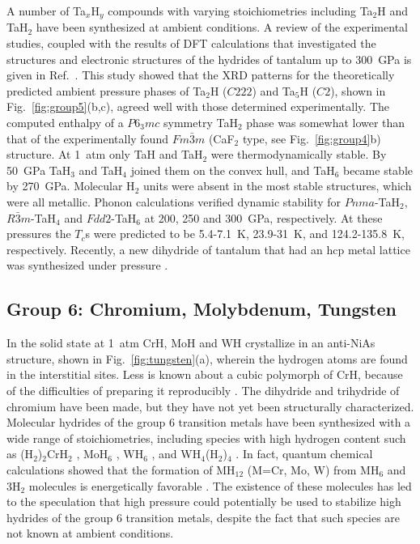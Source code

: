 \documentclass[12pt,letterpaper,oneside]{article}
\begin{document}
A number of Ta$_x$H$_y$ compounds with varying stoichiometries including Ta$_2$H and TaH$_2$ have been synthesized at ambient conditions. A review of the experimental studies, coupled with the results of DFT calculations that investigated the structures and electronic structures of the hydrides of tantalum up to 300~GPa is given in Ref.\ \cite{Zhuang:2017a}. This study showed that 
the XRD patterns for the theoretically predicted ambient pressure phases of Ta$_2$H ($C222$) and Ta$_5$H ($C2$), shown in Fig.\ \ref{fig:group5}(b,c), agreed well with those determined experimentally. The computed enthalpy of a $P6_3mc$ symmetry TaH$_2$ phase was somewhat lower than that of the experimentally found $Fm\bar{3}m$ (CaF$_2$ type, see Fig.\ \ref{fig:group4}b) structure. At 1~atm only TaH and TaH$_2$ were thermodynamically stable. By 50~GPa TaH$_3$ and TaH$_4$ joined them on the convex hull, and TaH$_6$ became stable by 270~GPa. Molecular H$_2$ units were absent in the most stable structures, which were all metallic. Phonon calculations verified dynamic stability for $Pnma$-TaH$_2$, $R\bar{3}m$-TaH$_4$ and $Fdd2$-TaH$_6$ at 200, 250 and 300~GPa, respectively. At these pressures the $T_c$s were predicted to be 5.4-7.1~K, 23.9-31~K, and 124.2-135.8~K, respectively. Recently, a new dihydride of tantalum that had an hcp metal lattice was synthesized under pressure \cite{Kuzovnikov:2017a}. 


\subsection{Group 6: Chromium, Molybdenum, Tungsten} 
%
In the solid state at 1~atm CrH, MoH and WH crystallize in an anti-NiAs structure, shown in Fig.\ \ref{fig:tungsten}(a), wherein the hydrogen atoms are found in the interstitial sites. Less is known about a cubic polymorph of CrH, because of the difficulties of preparing it reproducibly \cite{Snavely:1949,Pozniak:2001}. The dihydride and trihydride of chromium have been made, but they have not yet been structurally characterized. Molecular hydrides of the group 6 transition metals have been synthesized with a wide range of stoichiometries, including species with high hydrogen content such as (H$_2$)$_2$CrH$_2$ \cite{Wang:2003}, MoH$_6$ \cite{Wang:2005}, WH$_6$ \cite{Wang:2002}, and WH$_4$(H$_2$)$_4$ \cite{Wang:2008a}. In fact, quantum chemical calculations showed that the formation of MH$_{12}$ (M=Cr, Mo, W) from MH$_6$ and 3H$_2$ molecules is energetically favorable \cite{Gagliardi:2004}. The existence of these molecules has led to the speculation that high pressure could potentially be used to stabilize high hydrides of the group 6 transition metals, despite the fact that such species are not known at ambient conditions.
\end{document}
